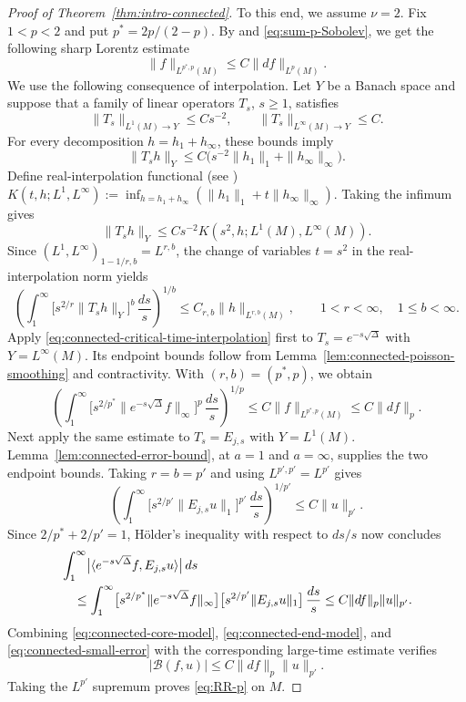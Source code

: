 \documentclass[12pt]{amsart}
\theoremstyle{remark}
\begin{document}
\begin{proof}[Proof of Theorem~\ref{thm:intro-connected}]
To this end, we assume $\nu=2$.
Fix $1<p<2$ and put $p^*=2p/(2-p)$.
By \cite[Theorem~4.3]{BCLS95} and
\eqref{eq:sum-p-Sobolev}, we get the following sharp Lorentz estimate
\begin{equation}\label{eq:connected-critical-Lorentz-Sobolev}
 \|f\|_{L^{p^*,p}(M)}\leq C\|df\|_{L^p(M)}.
\end{equation}
We use the following consequence of interpolation. Let $Y$ be a Banach space and suppose that a family of linear operators
$T_s$, $s\geq1$, satisfies
\[
 \|T_s\|_{L^1(M)\to Y}\leq Cs^{-2},
 \qquad
 \|T_s\|_{L^\infty(M)\to Y}\leq C.
\]
For every decomposition $h=h_1+h_\infty$, these bounds imply
\[
 \|T_sh\|_Y
 \leq C\bigl(s^{-2}\|h_1\|_1+\|h_\infty\|_\infty\bigr).
\]
Define real-interpolation functional (see \cite[Chapter~3,~5]{BerghLofstrom}) $K(t,h;L^1,L^\infty):= \inf_{h=h_1+h_\infty} \left(\|h_1\|_1+t\|h_\infty\|_\infty\right)$. Taking the infimum gives
\[
 \|T_sh\|_Y
 \leq Cs^{-2}K(s^2,h;L^1(M),L^\infty(M)).
\]
Since
$(L^1,L^\infty)_{1-1/r,b}=L^{r,b}$, the change of variables $t=s^2$
in the real-interpolation norm yields
\begin{equation}\label{eq:connected-critical-time-interpolation}
 \left(
 \int_1^\infty
 \bigl[s^{2/r}\|T_sh\|_Y\bigr]^b\,\frac{ds}{s}
 \right)^{1/b}
 \leq C_{r,b}\|h\|_{L^{r,b}(M)},
 \qquad 1<r<\infty,\quad 1\leq b<\infty.
\end{equation}
Apply \eqref{eq:connected-critical-time-interpolation} first to
$T_s=e^{-s\sqrt\Delta}$ with $Y=L^\infty(M)$.
Its endpoint bounds follow from
Lemma~\ref{lem:connected-poisson-smoothing} and contractivity.
With $(r,b)=(p^*,p)$, we obtain
\[
 \left(
 \int_1^\infty
 \bigl[s^{2/p^*}\|e^{-s\sqrt\Delta}f\|_\infty\bigr]^p
 \,\frac{ds}{s}
 \right)^{1/p}
 \leq C\|f\|_{L^{p^*,p}(M)}
 \leq C\|df\|_p.
\]
Next apply the same estimate to $T_s=E_{j,s}$ with $Y=L^1(M)$.
Lemma~\ref{lem:connected-error-bound}, at $a=1$ and $a=\infty$,
supplies the two endpoint bounds.
Taking $r=b=p'$ and using $L^{p',p'}=L^{p'}$ gives
\[
 \left(
 \int_1^\infty
 \bigl[s^{2/p'}\|E_{j,s}u\|_1\bigr]^{p'}
 \,\frac{ds}{s}
 \right)^{1/p'}
 \leq C\|u\|_{p'}.
\]
Since $2/p^* + 2/p'=1$, H\"older's inequality with respect to $ds/s$ now concludes
\begin{align*}
 &\int_1^\infty
 \bigl|\langle e^{-s\sqrt\Delta}f,E_{j,s}u\rangle\bigr|\,ds
 \notag\\
 &\quad\leq
 \int_1^\infty
 \bigl[s^{2/p^*}\|e^{-s\sqrt\Delta}f\|_\infty\bigr]
 \bigl[s^{2/p'}\|E_{j,s}u\|_1\bigr]\,\frac{ds}{s} \leq C\|df\|_p\|u\|_{p'}.
\end{align*}
Combining \eqref{eq:connected-core-model},
\eqref{eq:connected-end-model}, and
\eqref{eq:connected-small-error} with the corresponding large-time
estimate verifies
\[
 |\mathcal B(f,u)|\leq C\|df\|_p\|u\|_{p'}.
\]
Taking the $L^{p'}$ supremum proves \eqref{eq:RR-p} on $M$.
\end{proof}
\end{document}
